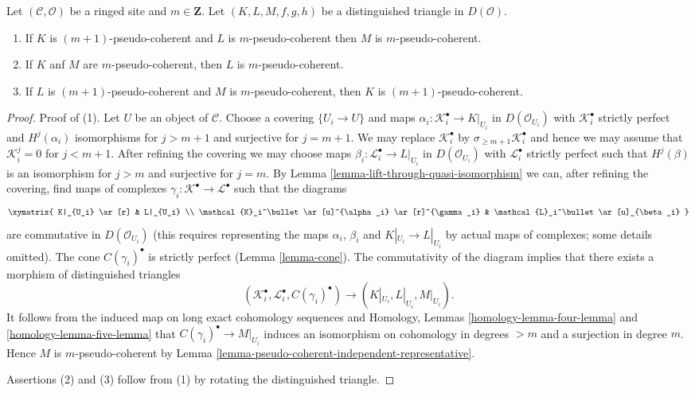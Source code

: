 \begin{lemma}
\label{lemma-cone-pseudo-coherent}
Let $(\mathcal{C}, \mathcal{O})$ be a ringed site and $m \in \mathbf{Z}$.
Let $(K, L, M, f, g, h)$ be a distinguished triangle in $D(\mathcal{O})$.
\begin{enumerate}
\item If $K$ is $(m + 1)$-pseudo-coherent and $L$ is $m$-pseudo-coherent
then $M$ is $m$-pseudo-coherent.
\item If $K$ anf $M$ are $m$-pseudo-coherent, then $L$ is $m$-pseudo-coherent.
\item If $L$ is $(m + 1)$-pseudo-coherent and $M$
is $m$-pseudo-coherent, then $K$ is $(m + 1)$-pseudo-coherent.
\end{enumerate}
\end{lemma}

\begin{proof}
Proof of (1). Let $U$ be an object of $\mathcal{C}$. Choose a covering
$\{U_i \to U\}$ and maps $\alpha_i : \mathcal{K}_i^\bullet \to K|_{U_i}$
in $D(\mathcal{O}_{U_i})$ with $\mathcal{K}_i^\bullet$ strictly perfect and
$H^j(\alpha_i)$ isomorphisms for $j > m + 1$ and surjective for $j = m + 1$.
We may replace $\mathcal{K}_i^\bullet$ by
$\sigma_{\geq m + 1}\mathcal{K}_i^\bullet$
and hence we may assume that $\mathcal{K}_i^j = 0$
for $j < m + 1$. After refining the covering we may choose
maps $\beta_i : \mathcal{L}_i^\bullet \to L|_{U_i}$ in $D(\mathcal{O}_{U_i})$
with $\mathcal{L}_i^\bullet$ strictly perfect such that
$H^j(\beta)$ is an isomorphism for $j > m$ and
surjective for $j = m$. By
Lemma \ref{lemma-lift-through-quasi-isomorphism}
we can, after refining the covering, find maps of complexes
$\gamma_i : \mathcal{K}^\bullet \to \mathcal{L}^\bullet$
such that the diagrams
$$
\xymatrix{
K|_{U_i} \ar[r] & L|_{U_i} \\
\mathcal{K}_i^\bullet \ar[u]^{\alpha_i} \ar[r]^{\gamma_i} &
\mathcal{L}_i^\bullet \ar[u]_{\beta_i}
}
$$
are commutative in $D(\mathcal{O}_{U_i})$ (this requires representing the
maps $\alpha_i$, $\beta_i$ and $K|_{U_i} \to L|_{U_i}$
by actual maps of complexes; some details omitted).
The cone $C(\gamma_i)^\bullet$ is strictly perfect (Lemma \ref{lemma-cone}).
The commutativity of the diagram implies that there exists a morphism
of distinguished triangles
$$
(\mathcal{K}_i^\bullet, \mathcal{L}_i^\bullet, C(\gamma_i)^\bullet)
\longrightarrow
(K|_{U_i}, L|_{U_i}, M|_{U_i}).
$$
It follows from the induced map on long exact cohomology sequences and
Homology, Lemmas \ref{homology-lemma-four-lemma} and
\ref{homology-lemma-five-lemma}
that $C(\gamma_i)^\bullet \to M|_{U_i}$ induces an isomorphism
on cohomology in degrees $> m$ and a surjection in degree $m$.
Hence $M$ is $m$-pseudo-coherent by
Lemma \ref{lemma-pseudo-coherent-independent-representative}.

\medskip\noindent
Assertions (2) and (3) follow from (1) by rotating the distinguished
triangle.
\end{proof}

